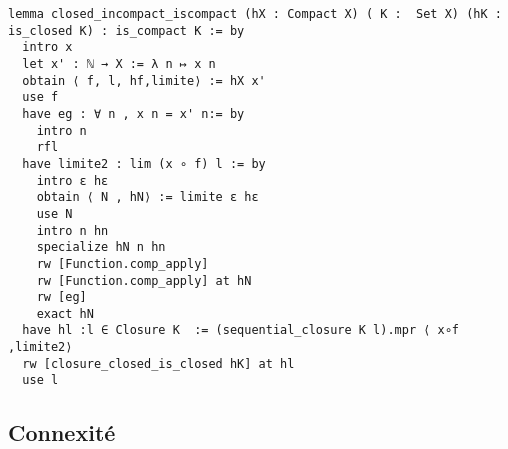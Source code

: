 \documentclass[a4paper, 12pt]{article}
\begin{document}

\begin{verbatim}
lemma closed_incompact_iscompact (hX : Compact X) ( K :  Set X) (hK : is_closed K) : is_compact K := by
  intro x
  let x' : ℕ → X := λ n ↦ x n
  obtain ⟨ f, l, hf,limite⟩ := hX x'
  use f 
  have eg : ∀ n , x n = x' n:= by
    intro n
    rfl
  have limite2 : lim (x ∘ f) l := by
    intro ε hε 
    obtain ⟨ N , hN⟩ := limite ε hε 
    use N 
    intro n hn
    specialize hN n hn
    rw [Function.comp_apply]
    rw [Function.comp_apply] at hN
    rw [eg]
    exact hN
  have hl :l ∈ Closure K  := (sequential_closure K l).mpr ⟨ x∘f ,limite2⟩ 
  rw [closure_closed_is_closed hK] at hl
  use l
\end{verbatim}




\subsection{Connexité}

\newpage

\nocite{*}


\end{document}
